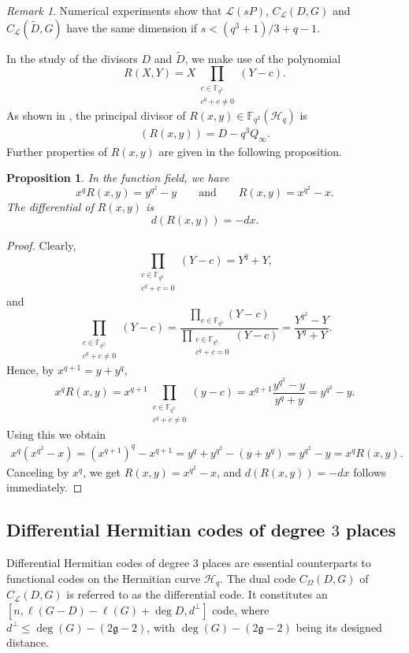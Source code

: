 \documentclass[11pt]{amsart}
\theoremstyle{plain}
\newtheorem{proposition}[theorem]{Proposition}
\theoremstyle{definition}
\theoremstyle{remark}
\newtheorem*{remark}{Remark}
\newcommand{\g}{\mathfrak{g}}
\begin{document}
\begin{remark}
Numerical experiments show that $\mathscr{L}(sP)$, $C_{\mathcal{L}}(D,G)$ and $C_{\mathcal{L}}(\tilde{D},G)$ have the same dimension if $s<(q^3+1)/3+q-1$. 
\end{remark}


In the study of the divisors $D$ and $\tilde{D}$, we make use of the polynomial 
\[R(X,Y) = X \prod\limits_{\substack{c \in \mathbb{F}_{q^2} \\ c^q + c \neq 0}} (Y-c).\] 
As shown in \cite[Section~2]{korchmaros2013hermitian}, the principal divisor of $R(x,y) \in \mathbb{F}_{q^2}(\mathscr{H}_q)$ is
\begin{align} \label{eq:Rxy-pricdiv}
(R(x,y)) = D-q^3 Q_\infty.
\end{align}
Further properties of $R(x,y)$ are given in the following proposition.
\begin{proposition} \label{pr:Rxy-props}
In the function field, we have 
\[x^{q}R(x, y) = y^{q^2} - y \qquad \text{and} \qquad R(x, y) = x^{q^2} - x.\]
The differential of $R(x,y)$ is 
\[d(R(x,y))=-dx. \]
\end{proposition} 
\begin{proof}
Clearly,
\[\prod\limits_{\substack{c \in \mathbb{F}_{q^2} \\ c^q + c = 0}} (Y-c) = Y^q+Y,\]
and
\[\prod\limits_{\substack{c \in \mathbb{F}_{q^2} \\ c^q + c \neq 0}} (Y-c) = \frac{\prod\limits_{c \in \mathbb{F}_{q^2}} (Y-c)}{\prod\limits_{\substack{c \in \mathbb{F}_{q^2} \\ c^q + c = 0}} (Y-c)} = \frac{Y^{q^2}-Y}{Y^q+Y}.\]
Hence, by $x^{q+1}=y+y^q$, 
\[x^qR(x,y) = x^{q+1} \prod\limits_{\substack{c \in \mathbb{F}_{q^2} \\ c^q + c \neq 0}} (y-c) = x^{q+1}\frac{y^{q^2}-y}{y^q+y} = y^{q^2}-y.\]
Using this we obtain
\begin{align*}
x^q(x^{q^2}-x) = (x^{q+1})^q-x^{q+1} = y^q+y^{q^2} - (y+y^q) = y^{q^2}-y = x^qR(x,y).
\end{align*}
Canceling by $x^q$, we get $R(x,y)=x^{q^2}-x$, and $d(R(x,y))=-dx$ follows immediately. 
\end{proof}

\subsection{Differential Hermitian codes of degree $3$ places}

Differential Hermitian codes of degree $3$ places are essential counterparts to functional codes on the Hermitian curve $\mathscr{H}_q$. The dual code $C_{\Omega}(D,G)$ of $C_{\mathcal{L}}(D,G)$ is referred to as the differential code. It constitutes an $[n, \ell(G -D)-\ell(G) +\deg D, d^{\perp}]$ code, where $d^{\perp} \leq \deg(G) - (2\g -2)$, with $\deg(G) - (2\g -2)$ being its designed distance.
\end{document}
